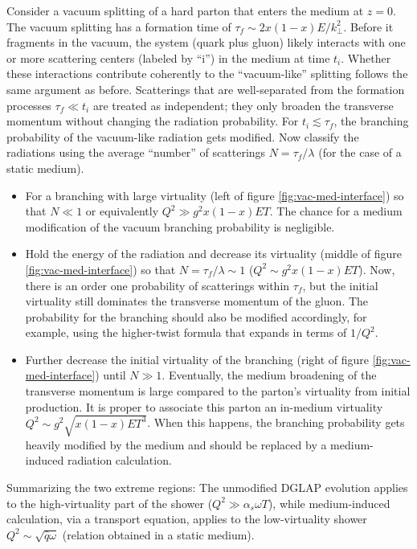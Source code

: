 Consider a vacuum splitting of a hard parton that enters the medium at $z=0$.
The vacuum splitting has a formation time of $\tau_f \sim 2x(1-x)E/k_\perp^2$.
Before it fragments in the vacuum, the system (quark plus gluon) likely interacts with one or more scattering centers (labeled by ``i'') in the medium at time $t_i$.
Whether these interactions contribute coherently to the ``vacuum-like'' splitting follows the same argument as before.
Scatterings that are well-separated from the formation processes $\tau_f \ll t_i$ are treated as independent; they only broaden the transverse momentum without changing the radiation probability.
For $t_i \lesssim \tau_f$, the branching probability of the vacuum-like radiation gets modified.
Now classify the radiations using the average ``number'' of scatterings  $N = \tau_f/\lambda$ (for the case of a static medium).
\begin{itemize}
\item For a branching with large virtuality (left of figure \ref{fig:vac-med-interface}) so that $N \ll 1$ or equivalently $Q^2 \gg  g^2 x(1-x)E T$. 
The chance for a medium modification of the vacuum branching probability is negligible. 
\item Hold the energy of the radiation and decrease its virtuality (middle of figure \ref{fig:vac-med-interface}) so that $N = \tau_f/\lambda \sim 1$ ($Q^2 \sim g^2 x(1-x)E T$). 
Now, there is an order one probability of scatterings within $\tau_f$, but the initial virtuality still dominates the transverse momentum of the gluon.
The probability for the branching should also be modified accordingly, for example, using the higher-twist formula that expands in terms of $1/Q^2$.
\item Further decrease the initial virtuality of the branching (right of figure \ref{fig:vac-med-interface}) until $N \gg 1$.
Eventually, the medium broadening of the transverse momentum is large compared to the parton's virtuality from initial production.
It is proper to associate this parton an in-medium virtuality $Q^2 \sim g^2\sqrt{x(1-x)E T^3}$. 
When this happens, the branching probability gets heavily modified by the medium and should be replaced by a medium-induced radiation calculation.
\end{itemize}
Summarizing the two extreme regions:
The unmodified DGLAP evolution applies to the high-virtuality part of the shower ($Q^2 \gg \alpha_s \omega T$), while medium-induced calculation, via a transport equation, applies to the low-virtuality shower $Q^2 \sim \sqrt{\hat{q}\omega}$ (relation obtained in a static medium).
